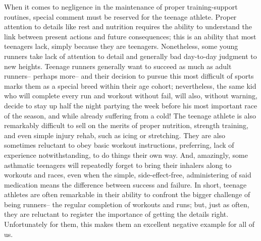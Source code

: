 When it comes to negligence in the maintenance of proper training-support routines, special comment must be reserved for the teenage athlete. Proper attention to details like rest and nutrition requires the ability to understand the link between present actions and future consequences; this is an ability that most teenagers lack, simply because they are teenagers. Nonetheless, some young runners take lack of attention to detail and generally bad day-to-day judgment to new heights. Teenage runners generally want to succeed as much as adult runners-- perhaps more-- and their decision to pursue this most difficult of sports marks them as a special breed within their age cohort; nevertheless, the same kid who will complete every run and workout without fail, will also, without warning, decide to stay up half the night partying the week before his most important race of the season, and while already suffering from a cold! The teenage athlete is also remarkably difficult to sell on the merits of proper nutrition, strength training, and even simple injury rehab, such as icing or stretching. They are also sometimes reluctant to obey basic workout instructions, preferring, lack of experience notwithstanding, to do things their own way. And, amazingly, some asthmatic teenagers will repeatedly forget to bring their inhalers along to workouts and races, even when the simple, side-effect-free, administering of said medication means the difference between success and failure. In short, teenage athletes are often remarkable in their ability to confront the bigger challenge of being runners-- the regular completion of workouts and runs; but, just as often, they are reluctant to register the importance of getting the details right. Unfortunately for them, this makes them an excellent negative example for all of us.

